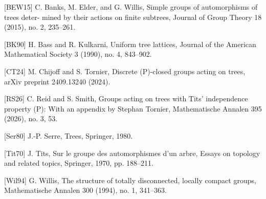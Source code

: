 \documentclass[preview]{standalone}
\begin{document}
\begin{center}
[BEW15] C. Banks, M. Elder, and G. Willis, Simple groups of automorphisms of trees deter- mined by their actions on finite subtrees, Journal of Group Theory 18 (2015), no. 2, 235–261.
                        
                        [BK90] H. Bass and R. Kulkarni, Uniform tree lattices, Journal of the American Mathematical Society 3 (1990), no. 4, 843–902.

                        [CT24] M. Chijoff and S. Tornier, Discrete (P)-closed groups acting on trees, arXiv preprint 2409.13240 (2024).

                        [RS26] C. Reid and S. Smith, Groups acting on trees with Tits’ independence property (P): With an appendix by Stephan Tornier, Mathematische Annalen 395 (2026), no. 3, 53.

                        [Ser80] J.-P. Serre, Trees, Springer, 1980.

                        [Tit70] J. Tits, Sur le groupe des automorphismes d’un arbre, Essays on topology and related topics, Springer, 1970, pp. 188–211.

                        [Wil94] G. Willis, The structure of totally disconnected, locally compact groups, Mathematische Annalen 300 (1994), no. 1, 341–363.
\end{center}
\end{document}
